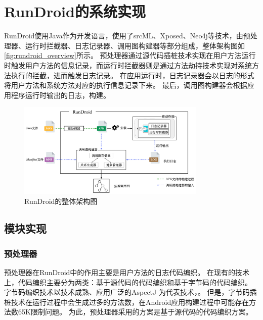 
\chapter{RunDroid的系统实现 }

\label{chp:implement}

RunDroid使用Java作为开发语言，使用了srcML、Xposed、Neo4j等技术，由预处理器、运行时拦截器、日志记录器、调用图构建器等部分组成，整体架构图如\autoref{fig:rundroid_overview}所示。
预处理器通过源代码插桩技术实现在用户方法运行时触发用户方法的信息记录，而运行时拦截器则是通过方法劫持技术实现对系统方法执行的拦截，进而触发日志记录。
在应用运行时，日志记录器会以日志的形式将用户方法和系统方法对应的执行信息记录下来。
最后，调用图构建器会根据应用程序运行时输出的日志，构建\ecg 。

\begin{figure}[!hb]
	\centering
	\includegraphics[width=0.8\textwidth]{./Figures/overview.png}
	\caption{ RunDroid的整体架构图}
	\label{fig:rundroid_overview}
\end{figure}


\section{模块实现}



\subsection{预处理器}

预处理器在RunDroid中的作用主要是用户方法的日志代码编织。
在现有的技术上，代码编织主要分为两类：基于源代码的代码编织和基于字节码的代码编织。
字节码编织技术以技术成熟、应用广泛的AspectJ\cite{TheAspecJ} 为代表技术，。
但是，字节码插桩技术在运行过程中会生成过多的方法数，在Android应用构建过程中可能存在方法数65K限制问题。
为此，预处理器采用的方案是基于源代码的代码编织方案。

